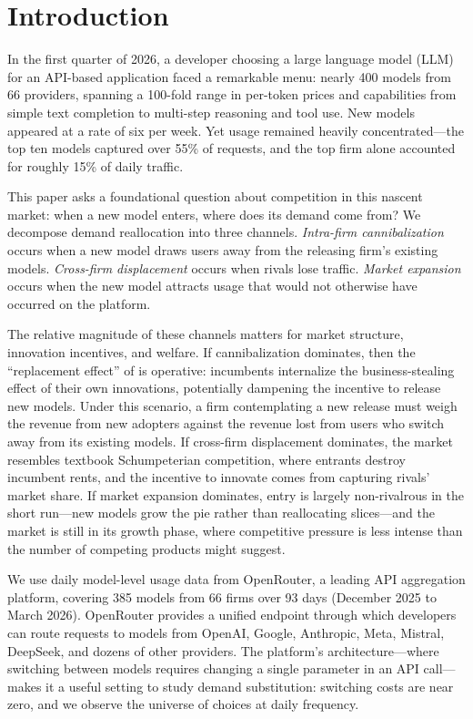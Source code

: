 \documentclass[11pt, a4paper]{article}
\begin{document}
\newpage

\section{Introduction}

In the first quarter of 2026, a developer choosing a large language model (LLM) for an API-based application faced a remarkable menu: nearly 400 models from 66 providers, spanning a 100-fold range in per-token prices and capabilities from simple text completion to multi-step reasoning and tool use. New models appeared at a rate of six per week. Yet usage remained heavily concentrated---the top ten models captured over 55\% of requests, and the top firm alone accounted for roughly 15\% of daily traffic.

This paper asks a foundational question about competition in this nascent market: when a new model enters, where does its demand come from? We decompose demand reallocation into three channels. \emph{Intra-firm cannibalization} occurs when a new model draws users away from the releasing firm's existing models. \emph{Cross-firm displacement} occurs when rivals lose traffic. \emph{Market expansion} occurs when the new model attracts usage that would not otherwise have occurred on the platform.

The relative magnitude of these channels matters for market structure, innovation incentives, and welfare. If cannibalization dominates, then the ``replacement effect'' of \citet{arrow1962economic} is operative: incumbents internalize the business-stealing effect of their own innovations, potentially dampening the incentive to release new models. Under this scenario, a firm contemplating a new release must weigh the revenue from new adopters against the revenue lost from users who switch away from its existing models. If cross-firm displacement dominates, the market resembles textbook Schumpeterian competition, where entrants destroy incumbent rents, and the incentive to innovate comes from capturing rivals' market share. If market expansion dominates, entry is largely non-rivalrous in the short run---new models grow the pie rather than reallocating slices---and the market is still in its growth phase, where competitive pressure is less intense than the number of competing products might suggest.

We use daily model-level usage data from OpenRouter, a leading API aggregation platform, covering 385 models from 66 firms over 93 days (December 2025 to March 2026). OpenRouter provides a unified endpoint through which developers can route requests to models from OpenAI, Google, Anthropic, Meta, Mistral, DeepSeek, and dozens of other providers. The platform's architecture---where switching between models requires changing a single parameter in an API call---makes it a useful setting to study demand substitution: switching costs are near zero, and we observe the universe of choices at daily frequency.
\end{document}
